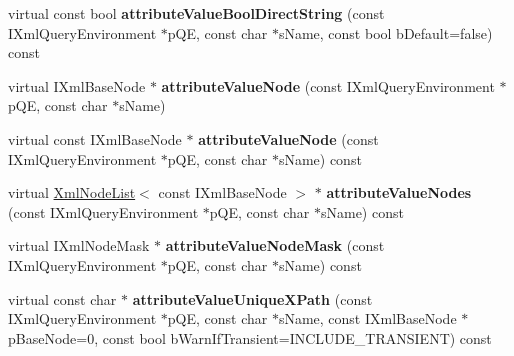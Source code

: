 \begin{DoxyCompactItemize}
\item 
\hypertarget{classgeneral__server_1_1XmlBaseNode_a5282e3bd4f681014edfc565e1e78fe1e}{virtual const bool {\bfseries attribute\-Value\-Bool\-Direct\-String} (const \-I\-Xml\-Query\-Environment $\ast$p\-Q\-E, const char $\ast$s\-Name, const bool b\-Default=false) const }\label{classgeneral__server_1_1XmlBaseNode_a5282e3bd4f681014edfc565e1e78fe1e}

\item 
\hypertarget{classgeneral__server_1_1XmlBaseNode_a5fff9f90df54dd568517a148d6f79b56}{virtual \-I\-Xml\-Base\-Node $\ast$ {\bfseries attribute\-Value\-Node} (const \-I\-Xml\-Query\-Environment $\ast$p\-Q\-E, const char $\ast$s\-Name)}\label{classgeneral__server_1_1XmlBaseNode_a5fff9f90df54dd568517a148d6f79b56}

\item 
\hypertarget{classgeneral__server_1_1XmlBaseNode_a696f9fa51b19a069d5582b8173e75de5}{virtual const \-I\-Xml\-Base\-Node $\ast$ {\bfseries attribute\-Value\-Node} (const \-I\-Xml\-Query\-Environment $\ast$p\-Q\-E, const char $\ast$s\-Name) const }\label{classgeneral__server_1_1XmlBaseNode_a696f9fa51b19a069d5582b8173e75de5}

\item 
\hypertarget{classgeneral__server_1_1XmlBaseNode_a2deda3589cf29d4d82c99b3108dbe56f}{virtual \hyperlink{classgeneral__server_1_1XmlNodeList}{\-Xml\-Node\-List}$<$ const \*
\-I\-Xml\-Base\-Node $>$ $\ast$ {\bfseries attribute\-Value\-Nodes} (const \-I\-Xml\-Query\-Environment $\ast$p\-Q\-E, const char $\ast$s\-Name) const }\label{classgeneral__server_1_1XmlBaseNode_a2deda3589cf29d4d82c99b3108dbe56f}

\item 
\hypertarget{classgeneral__server_1_1XmlBaseNode_a82bbb0010ccf022d9c0789cd2eed92fe}{virtual \-I\-Xml\-Node\-Mask $\ast$ {\bfseries attribute\-Value\-Node\-Mask} (const \-I\-Xml\-Query\-Environment $\ast$p\-Q\-E, const char $\ast$s\-Name) const }\label{classgeneral__server_1_1XmlBaseNode_a82bbb0010ccf022d9c0789cd2eed92fe}

\item 
\hypertarget{classgeneral__server_1_1XmlBaseNode_a37a48fc0c0130ca8270a8d6047074c85}{virtual const char $\ast$ {\bfseries attribute\-Value\-Unique\-X\-Path} (const \-I\-Xml\-Query\-Environment $\ast$p\-Q\-E, const char $\ast$s\-Name, const \-I\-Xml\-Base\-Node $\ast$p\-Base\-Node=0, const bool b\-Warn\-If\-Transient=\-I\-N\-C\-L\-U\-D\-E\-\_\-\-T\-R\-A\-N\-S\-I\-E\-N\-T) const }\label{classgeneral__server_1_1XmlBaseNode_a37a48fc0c0130ca8270a8d6047074c85}


\end{DoxyCompactItemize}
